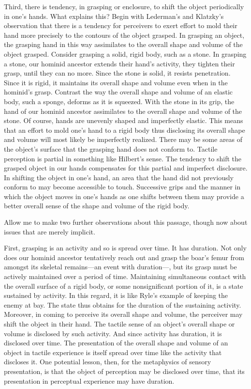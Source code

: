 \documentclass[12pt]{article}
\begin{document}
Third, there is tendency, in grasping or enclosure, to shift the object periodically in one's hands. What explains this? Begin with Lederman's and Klatzky's observation that there is a tendency for perceivers to exert effort to mold their hand more precisely to the contours of the object grasped. In grasping an object, the grasping hand in this way assimilates to the overall shape and volume of the object grasped. Consider grasping a solid, rigid body, such as a stone. In grasping a stone, our hominid ancestor extends their hand's activity, they tighten their grasp, until they can no more. Since the stone is solid, it resists penetration. Since it is rigid, it maintains its overall shape and volume even when in the hominid's grasp. Contrast the way the overall shape and volume of an elastic body, such a sponge, deforms as it is squeezed. With the stone in its grip, the hand of our hominid ancestor assimilates to the overall shape and volume of the stone. Of course, hands are unevenly shaped and imperfectly elastic. This means that an effort to mold one's hand to a rigid body thus disclosing its overall shape and volume will most likely be imperfectly realized. There may be some areas of the object's surface that the grasping hand does not conform to. Tactile perception is partial in something like Hilbert's \citeyearpar{Hilbert:1987jq} sense. The tendency to shift the grasped object in our hands compensates for this partial and imperfect disclosure. In shifting the object in one's hand, an area that the hand did not previously conform to may become accessible to touch. Successive grips and the manner in which the object moves in one's hands as one shifts between them may provide a better overall sense of the shape and volume of the rigid body. 

Allow me to make two further observations about this passage, though now about issues that are merely implicit.

First, grasping is an activity and so is spread over time. It has duration. Not only does our hominid ancestor tentatively reach out and grasp the boar's femur from amongst its skeletal remains---an event with duration---, but its grasp must be actively maintained over a period of time. Maintaining simultaneous contact with the overall surface of a rigid body, or some nonsignificant portion of it, is a state sustained by activity. In this regard, it is like Ryle's \citeyearpar[149]{Ryle:1949qr} example of keeping the enemy at bay. The state thus obtains for the duration of the sustaining activity. Moreover, in coming to perceive its overall shape and volume, the perceiver may shift the object in their hand. The tactile sense of an object's overall shape or volume is disclosed by such activity. And since activity has duration, it is disclosed over time. The presentation of the overall shape and volume of an object in tactile experience is itself spread over time like the activity that discloses it. One potential lesson, then, for the metaphysics of sensory presentation, is that the object of perception may be disclosed over time, that its presentation in perceptual experience may have duration.
\end{document}
